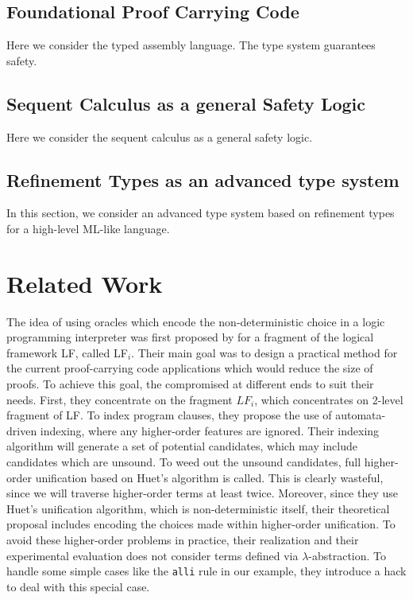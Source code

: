 \documentclass{acmconf}
\begin{document}
\subsection{Foundational Proof Carrying Code}
Here we consider the typed assembly language. The type system
guarantees safety.

\subsection{Sequent Calculus as a general Safety Logic}
Here we consider the sequent calculus as a general safety logic.

\subsection{Refinement Types as an advanced type system}
In this section, we consider an advanced type system based on
refinement types for a high-level ML-like language. 


\section{Related Work}
The idea of using oracles which encode the non-deterministic choice in
a logic programming interpreter was first proposed by
\cite{Necula+01:oracle} for a fragment of the logical framework LF,
called LF$_i$. Their main goal was to design a practical method for
the current proof-carrying code applications which would reduce the
size of proofs. To achieve this goal, the compromised at different
ends to suit their needs. First, they concentrate on the 
fragment $LF_i$, which concentrates on 2-level fragment of
LF. To index program clauses, they propose the use of automata-driven
indexing, where any higher-order features are ignored. Their
indexing algorithm will generate a set of potential candidates, which
may include candidates which are unsound. To weed out the unsound
candidates, full higher-order unification based on Huet's algorithm is
called. This is clearly wasteful, since we will traverse higher-order
terms at least twice. Moreover, since they use Huet's unification
algorithm, which is non-deterministic itself, their theoretical
proposal includes encoding the choices made within higher-order
unification. To avoid these higher-order problems in practice, their
realization and their experimental evaluation does not consider 
terms defined via $\lambda$-abstraction. To handle some simple cases
like the {\tt alli} rule in our example, they introduce a hack to deal
with this special case. 
\end{document}
